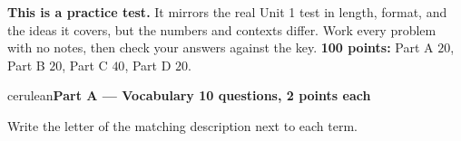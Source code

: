 \documentclass[10pt]{article}
\newcommand{\parthead}[1]{%
  \vspace{6pt}\noindent
  {\tcbset{after={\par\nopagebreak}}%
   \begin{headlinebox}{cerulean}{\color{white}\bfseries #1}\end{headlinebox}}%
  \nopagebreak\vspace{4pt}}
\begin{document}

\vspace{0.10in}
\begin{remindbox}
\small
\textbf{This is a practice test.} It mirrors the real Unit 1 test in length, format,
and the ideas it covers, but the numbers and contexts differ. Work every problem
with no notes, then check your answers against the key.
\textbf{100 points:} Part A $20$, Part B $20$, Part C $40$, Part D $20$.
\end{remindbox}

\parthead{Part A --- Vocabulary \hfill 10 questions, 2 points each}

\small
Write the letter of the matching description next to each term.
\end{document}
